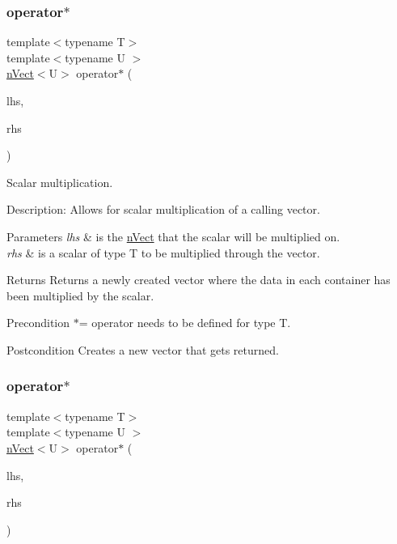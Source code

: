 \subsubsection{\texorpdfstring{operator$\ast$}{operator*}\hspace{0.1cm}{\footnotesize\ttfamily [1/2]}}
{\footnotesize\ttfamily template$<$typename T$>$ \\
template$<$typename U $>$ \\
\hyperlink{classnVect}{n\+Vect}$<$U$>$ operator$\ast$ (\begin{DoxyParamCaption}\item[{const \hyperlink{classnVect}{n\+Vect}$<$ U $>$ \&}]{lhs,  }\item[{const U \&}]{rhs }\end{DoxyParamCaption})\hspace{0.3cm}{\ttfamily [friend]}}



Scalar multiplication. 

Description\+: Allows for scalar multiplication of a calling vector. 
\begin{DoxyParams}{Parameters}
{\em lhs} & is the \hyperlink{classnVect}{n\+Vect} that the scalar will be multiplied on. \\
\hline
{\em rhs} & is a scalar of type T to be multiplied through the vector. \\
\hline
\end{DoxyParams}
\begin{DoxyReturn}{Returns}
Returns a newly created vector where the data in each container has been multiplied by the scalar. 
\end{DoxyReturn}
\begin{DoxyPrecond}{Precondition}
$\ast$= operator needs to be defined for type T. 
\end{DoxyPrecond}
\begin{DoxyPostcond}{Postcondition}
Creates a new vector that gets returned. 
\end{DoxyPostcond}
\mbox{\label{classnVect_a9673bd479b1647b3f4ed8a68b1b793a9}} 
\subsubsection{\texorpdfstring{operator$\ast$}{operator*}\hspace{0.1cm}{\footnotesize\ttfamily [2/2]}}
{\footnotesize\ttfamily template$<$typename T$>$ \\
template$<$typename U $>$ \\
\hyperlink{classnVect}{n\+Vect}$<$U$>$ operator$\ast$ (\begin{DoxyParamCaption}\item[{const U \&}]{lhs,  }\item[{const \hyperlink{classnVect}{n\+Vect}$<$ U $>$ \&}]{rhs }\end{DoxyParamCaption})\hspace{0.3cm}{\ttfamily [friend]}}



